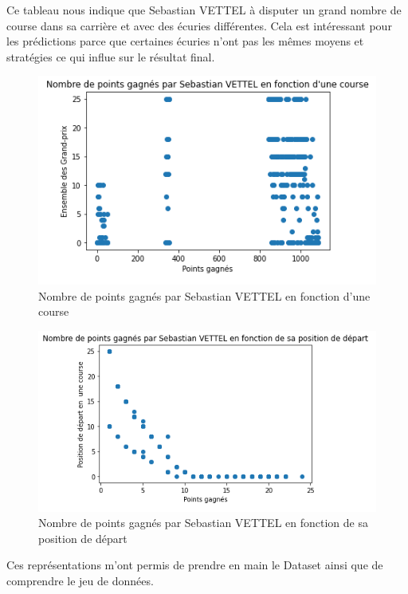 Ce tableau nous indique que Sebastian VETTEL à disputer un grand nombre de course dans sa carrière et avec des écuries différentes. Cela est intéressant pour les prédictions parce que certaines écuries n'ont pas les mêmes moyens et stratégies ce qui influe sur le résultat final.\\

\begin{figure}[H]
    \centering
    \includegraphics[width=.5\textwidth]{images/VettelRace.png} 
    \caption{Nombre de points gagnés par Sebastian VETTEL en fonction d'une course}
\end{figure}

\begin{figure}[H]
    \centering
    \includegraphics[width=.6\textwidth]{images/VettelPos.png} 
    \caption{Nombre de points gagnés par Sebastian VETTEL en fonction de sa position de départ}
\end{figure}

Ces représentations m'ont permis de prendre en main le Dataset ainsi que de comprendre le jeu de données.





